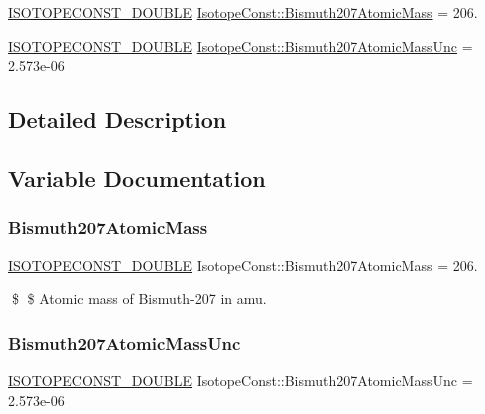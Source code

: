 \begin{DoxyCompactItemize}
\item 
\mbox{\hyperlink{group___isotope_const-_macros_ga8f45a7272ce02c0b4c65c44636ed719a}{I\+S\+O\+T\+O\+P\+E\+C\+O\+N\+S\+T\+\_\+\+D\+O\+U\+B\+LE}} \mbox{\hyperlink{group___isotope_const-_bismuth-_bi207_gad58a05c9d4556e901830d3e7502c1581}{Isotope\+Const\+::\+Bismuth207\+Atomic\+Mass}} = 206.
\item 
\mbox{\hyperlink{group___isotope_const-_macros_ga8f45a7272ce02c0b4c65c44636ed719a}{I\+S\+O\+T\+O\+P\+E\+C\+O\+N\+S\+T\+\_\+\+D\+O\+U\+B\+LE}} \mbox{\hyperlink{group___isotope_const-_bismuth-_bi207_ga94e3af0181497280c692f916b397622d}{Isotope\+Const\+::\+Bismuth207\+Atomic\+Mass\+Unc}} = 2.\+573e-\/06
\end{DoxyCompactItemize}


\subsection{Detailed Description}


\subsection{Variable Documentation}
\mbox{\label{group___isotope_const-_bismuth-_bi207_gad58a05c9d4556e901830d3e7502c1581}} 
\subsubsection{\texorpdfstring{Bismuth207\+Atomic\+Mass}{Bismuth207AtomicMass}}
{\footnotesize\ttfamily \mbox{\hyperlink{group___isotope_const-_macros_ga8f45a7272ce02c0b4c65c44636ed719a}{I\+S\+O\+T\+O\+P\+E\+C\+O\+N\+S\+T\+\_\+\+D\+O\+U\+B\+LE}} Isotope\+Const\+::\+Bismuth207\+Atomic\+Mass = 206.}

\$ \$ Atomic mass of Bismuth-\/207 in amu. \mbox{\label{group___isotope_const-_bismuth-_bi207_ga94e3af0181497280c692f916b397622d}} 
\subsubsection{\texorpdfstring{Bismuth207\+Atomic\+Mass\+Unc}{Bismuth207AtomicMassUnc}}
{\footnotesize\ttfamily \mbox{\hyperlink{group___isotope_const-_macros_ga8f45a7272ce02c0b4c65c44636ed719a}{I\+S\+O\+T\+O\+P\+E\+C\+O\+N\+S\+T\+\_\+\+D\+O\+U\+B\+LE}} Isotope\+Const\+::\+Bismuth207\+Atomic\+Mass\+Unc = 2.\+573e-\/06}

